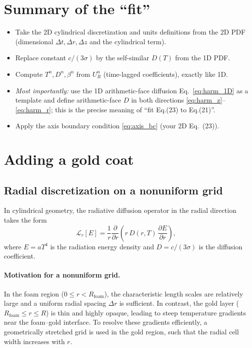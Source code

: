 \documentclass[11pt]{article}
\begin{document}
\section{Summary of the ``fit''}
\begin{itemize}
\item Take the 2D cylindrical discretization and units definitions from the 2D PDF (dimensional $\Delta t,\Delta r,\Delta z$ and the cylindrical term).
\item Replace constant $c/(3\sigma)$ by the self-similar $D(T)$ from the 1D PDF.
\item Compute $T^n, D^n, \beta^n$ from $U_R^n$ (time-lagged coefficients), exactly like 1D.
\item \emph{Most importantly:} use the 1D arithmetic-face diffusion Eq.~\eqref{eq:harm_1D} as a template and define arithmetic-face $D$ in both directions \eqref{eq:harm_z}--\eqref{eq:harm_r}; this is the precise meaning of ``fit Eq.(23) to Eq.(21)''.
\item Apply the axis boundary condition \eqref{eq:axis_bc} (your 2D Eq.~(23)).
\end{itemize}

\section{Adding a gold coat}
\subsection{Radial discretization on a nonuniform grid}

In cylindrical geometry, the radiative diffusion operator in the radial direction
takes the form
\begin{equation}
\mathcal{L}_r[E]
=
\frac{1}{r}\frac{\partial}{\partial r}
\left(
r\, D(r,T)\, \frac{\partial E}{\partial r}
\right),
\end{equation}
where $E=aT^4$ is the radiation energy density and $D=c/(3\sigma)$ is the diffusion
coefficient.

\paragraph{Motivation for a nonuniform grid.}
In the foam region ($0 \le r < R_{\mathrm{foam}}$), the characteristic length scales
are relatively large and a uniform radial spacing $\Delta r$ is sufficient.
In contrast, the gold layer ($R_{\mathrm{foam}} \le r \le R$) is thin and highly opaque,
leading to steep temperature gradients near the foam--gold interface.
To resolve these gradients efficiently, a geometrically stretched grid is used
in the gold region, such that the radial cell width increases with $r$.
\end{document}
